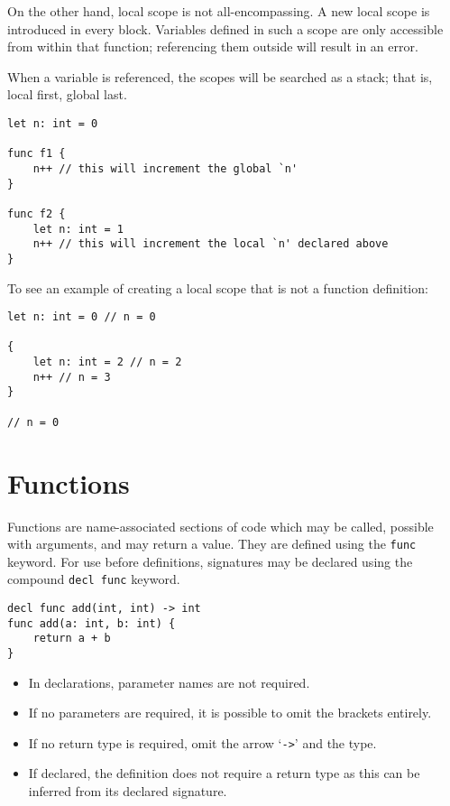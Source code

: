 \documentclass{article}
\begin{document}
On the other hand, local scope is not all-encompassing.
A new local scope is introduced in every block.
Variables defined in such a scope are only accessible from within that function; referencing them outside will result in an error.

When a variable is referenced, the scopes will be searched as a stack; that is, local first, global last.

\begin{lstlisting}[language=CustomLang]
let n: int = 0

func f1 {
    n++ // this will increment the global `n'
}

func f2 {
    let n: int = 1
    n++ // this will increment the local `n' declared above
}
\end{lstlisting}

To see an example of creating a local scope that is not a function definition:

\begin{lstlisting}[language=CustomLang]
let n: int = 0 // n = 0

{
    let n: int = 2 // n = 2
    n++ // n = 3
}

// n = 0
\end{lstlisting}

\section{Functions}

Functions are name-associated sections of code which may be called, possible with arguments, and may return a value.
They are defined using the \texttt{func} keyword.
For use before definitions, signatures may be declared using the compound \texttt{decl func} keyword.

\begin{lstlisting}[language=CustomLang]
decl func add(int, int) -> int
func add(a: int, b: int) {
    return a + b
}
\end{lstlisting}

\begin{itemize}
    \item In declarations, parameter names are not required.
    \item If no parameters are required, it is possible to omit the brackets entirely.
    \item If no return type is required, omit the arrow `\texttt{->}' and the type.
    \item If declared, the definition does not require a return type as this can be inferred from its declared signature.
\end{itemize}
\end{document}
